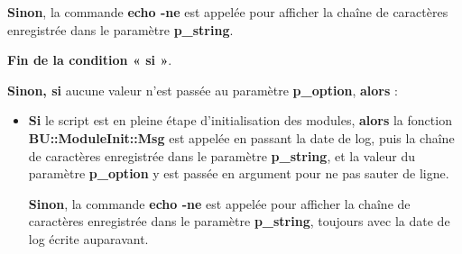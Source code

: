 \documentclass[a4paper,10pt]{article}
\begin{document}
\begin{itemize}
{\begin{itemize}
{\begin{itemize}
{                        \setlength{\parskip}{1em}

                        \begin{justify}
                            \textbf{\color{cond}Sinon}, la commande \textbf{\color{cmds}echo -ne} est appelée pour afficher la chaîne de caractères enregistrée dans le paramètre \textbf{\color{vars}p\_string}.
                        \end{justify}

                        \begin{justify}
                            \textbf{\color{cond}Fin de la condition « si »}.
                    \end{justify}
                    }
                \end{itemize}

                \item
                {
                    \setlength{\parskip}{2em}

                    \begin{justify}
                        \textbf{\color{case}Sinon, si} aucune valeur n'est passée au paramètre \textbf{\color{vars}p\_option}, \textbf{\color{case}alors} :
                    \end{justify}

                    \setlength{\parskip}{1em}
                }

                \begin{itemize}
                    \item
                    {
                        \begin{justify}
                            \textbf{\color{cond}Si} le script est en pleine étape d'initialisation des modules, \textbf{\color{cond}alors} la fonction \textbf{\color{func}BU::ModuleInit::Msg} est appelée en passant la date de log, puis la chaîne de caractères enregistrée dans le paramètre \textbf{\color{vars}p\_string}, et la valeur du paramètre \textbf{\color{vars}p\_option} y est passée en argument pour ne pas sauter de ligne.
                        \end{justify}

                        \setlength{\parskip}{1em}

                        \begin{justify}
                            \textbf{\color{cond}Sinon}, la commande \textbf{\color{cmds}echo -ne} est appelée pour afficher la chaîne de caractères enregistrée dans le paramètre \textbf{\color{vars}p\_string}, toujours avec la date de log écrite auparavant.
                        \end{justify}

}
\end{itemize}}
\end{itemize}}
\end{itemize}
\end{document}
